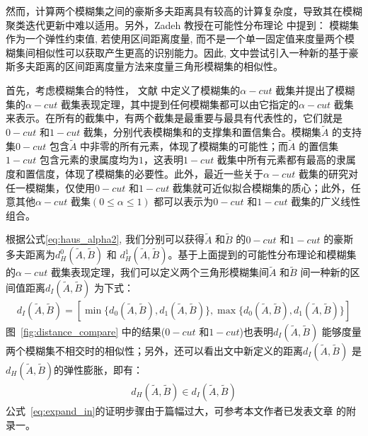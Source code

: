 然而，计算两个模糊集之间的豪斯多夫距离具有较高的计算复杂度，导致其在模糊聚类迭代更新中难以适用。另外，Zadeh 教授在可能性分布理论\cite{zadeh1978fuzzy} 中提到： 模糊集作为一个弹性约束值, 若使用区间距离度量, 而不是一个单一固定值来度量两个模糊集间相似性可以获取产生更高的识别能力。因此, 文中尝试引入一种新的基于豪斯多夫距离的区间距离度量方法来度量三角形模糊集的相似性。

首先，考虑模糊集合的特性， 文献 \cite{zadeh1978fuzzy} 中定义了模糊集的$\alpha-cut$ 截集并提出了模糊集的$\alpha-cut$ 截集表现定理，其中提到任何模糊集都可以由它指定的$\alpha-cut$ 截集来表示。在所有的截集中，有两个截集是最重要与最具有代表性的，它们就是$0-cut$ 和$1-cut$ 截集，分别代表模糊集和的支撑集和置信集合。模糊集$\tilde{A}$ 的支持集$0-cut$ 包含$\tilde{A}$ 中非零的所有元素，体现了模糊集的可能性；而$\tilde{A}$ 的置信集$1-cut$ 包含元素的隶属度均为$1$，这表明$1-cut$ 截集中所有元素都有最高的隶属度和置信度，体现了模糊集的必要性。此外，最近一些关于$\alpha-cut$ 截集的研究对任一模糊集，仅使用$0-cut$ 和$1-cut$ 截集就可近似拟合模糊集的质心；此外，任意其他$\alpha -cut$ 截集$ (0 \leq \alpha \leq 1)$ 都可以表示为$0-cut$ 和$1-cut$ 截集的广义线性组合\cite{liu2008efficient}。

根据公式\ref{eq:haus_alpha2}, 我们分别可以获得$\tilde{A}$ 和$\tilde{B}$ 的$0-cut$ 和$1-cut$ 的豪斯多夫距离为$d_H^{0} (\tilde{A}, \tilde{B})$ 和 $d_H^{1} (\tilde{A}, \tilde{B})$。基于上面提到的可能性分布理论和模糊集的$\alpha-cut$ 截集表现定理，我们可以定义两个三角形模糊集间$\tilde{A}$ 和$\tilde{B}$ 间一种新的区间值距离$d_I (\tilde{A}, \tilde{B})$ 为下式：
\begin{equation}\label{eq:interval}
    \begin{split}
        d _{I} (\tilde{A},\tilde{B}) = [\min \lbrace d_0 (\tilde{A},\tilde{B}),d_1(\tilde{A},\tilde{B}) \rbrace, \max \lbrace d_0(\tilde{A},\tilde{B}), d_1 (\tilde{A},\tilde{B}) \rbrace ]
    \end{split}
\end{equation}
图~\ref{fig:distance_compare} 中的结果($0-cut$ 和$1-cut$)也表明$d _{I} (\tilde{A},\tilde{B})$ 能够度量两个模糊集不相交时的相似性；另外，还可以看出文中新定义的距离$ d _{I} (\tilde{A},\tilde{B})$ 是$ d _{H} (\tilde{A},\tilde{B})$的弹性膨胀，即有：
\begin{equation}\label{eq:expand_in}
    \begin{split}
        d _{H} (\tilde{A},\tilde{B}) \in d _{I} (\tilde{A},\tilde{B})
    \end{split}
\end{equation}
公式~\ref{eq:expand_in}的证明步骤由于篇幅过大，可参考本文作者已发表文章\cite{jiang2018enhanced} 的附录一。

